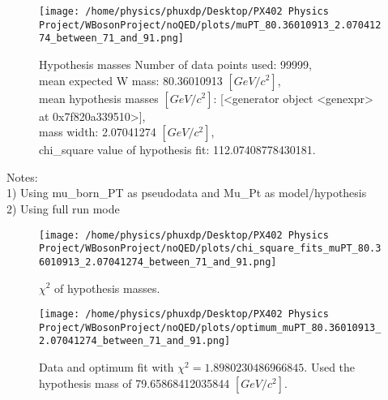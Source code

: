 \documentclass[12pt]{article}
\begin{document}
	\begin{figure}[tb]
		\centering
		\texttt{[image: /home/physics/phuxdp/Desktop/PX402 Physics Project/WBosonProject/noQED/plots/muPT\_80.36010913\_2.07041274\_between\_71\_and\_91.png]}
		\caption{\small Hypothesis masses Number of data points used: 99999,\\
mean expected W mass: 80.36010913 $[GeV/c^{2}]$,\\
mean hypothesis masses $[GeV/c^{2}]$: [<generator object <genexpr> at 0x7f820a339510>],\\
mass width: 2.07041274 $[GeV/c^{2}]$,\\
chi_square value of hypothesis fit: 112.07408778430181. }
		\label{fig: fig_0}
	\end{figure}
    Notes: \\
    1) Using mu\_born\_PT as pseudodata and  Mu\_Pt as model/hypothesis\\
    2) Using full run mode\\
       \begin{figure}[tb]
		\centering
		\texttt{[image: /home/physics/phuxdp/Desktop/PX402 Physics Project/WBosonProject/noQED/plots/chi\_square\_fits\_muPT\_80.36010913\_2.07041274\_between\_71\_and\_91.png]}
		\caption{\small $\chi^2$ of hypothesis masses. }
		\label{fig: fig_chi_square}
	\end{figure}

    \begin{figure}[tb]
		\centering
		\texttt{[image: /home/physics/phuxdp/Desktop/PX402 Physics Project/WBosonProject/noQED/plots/optimum\_muPT\_80.36010913\_2.07041274\_between\_71\_and\_91.png]}
		\caption{\small Data and optimum fit with $\chi^2 = 1.8980230486966845$. Used the hypothesis mass of 79.65868412035844 $[GeV/c^{2}]$. }
		\label{fig: fig_optim_parms}
	\end{figure}
    
\end{document}
